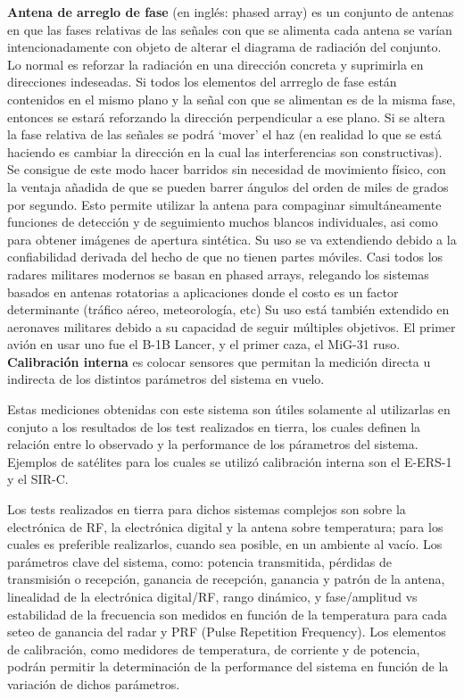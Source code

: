 \documentclass[a4paper,10pt]{article}
\begin{document}
{\textbf{Antena de arreglo de fase}} (en inglés: phased array) es un conjunto de
antenas en que las fases relativas de las señales con que se alimenta cada 
antena se varían intencionadamente con objeto de alterar el diagrama de 
radiación del conjunto. Lo normal es reforzar la radiación en una dirección 
concreta y suprimirla en direcciones indeseadas. Si todos los elementos del 
arrreglo de fase están contenidos en el mismo plano y la señal con que se 
alimentan es de la misma fase, entonces se estará reforzando la dirección 
perpendicular a ese plano. Si se altera la fase relativa de las señales se podrá
 \enquote*{mover} el haz (en realidad lo que se está haciendo es cambiar la 
dirección en la cual las interferencias son constructivas). Se consigue de este
modo hacer barridos sin necesidad de movimiento físico, con la ventaja añadida
de que se pueden barrer ángulos del orden de miles de grados por segundo. Esto
permite utilizar la antena para compaginar simultáneamente funciones de 
detección y de seguimiento muchos blancos individuales, asi como para obtener 
imágenes de apertura sintética. Su uso se va extendiendo debido a la 
confiabilidad derivada del hecho de que no tienen partes móviles. Casi todos los
radares militares modernos se basan en phased arrays, relegando los sistemas 
basados en antenas rotatorias a aplicaciones donde el costo es un factor 
determinante (tráfico aéreo, meteorología, etc) Su uso está también extendido en
aeronaves militares debido a su capacidad de seguir múltiples objetivos. El 
primer avión en usar uno fue el B-1B Lancer, y el primer caza, el MiG-31 ruso.\\

{\textbf{Calibración interna}} es colocar sensores que permitan la medición 
directa u indirecta de los distintos parámetros del sistema en vuelo. 

Estas mediciones obtenidas con este sistema son útiles solamente al utilizarlas
en conjuto a los resultados de los test realizados en tierra, los cuales definen
la relación entre lo observado y la performance de los párametros del sistema. 
Ejemplos de satélites para los cuales se utilizó calibración interna son el 
E-ERS-1 y el SIR-C.
    
Los tests realizados en tierra para dichos sistemas complejos son sobre la
electrónica de RF, la electrónica digital y la antena sobre temperatura; para 
los cuales es preferible realizarlos, cuando sea posible, en un ambiente al 
vacío. Los parámetros clave del sistema, como: potencia transmitida, pérdidas de
transmisión o recepción, ganancia de recepción, ganancia y patrón de la antena, 
linealidad de la electrónica digital/RF, rango dinámico, y fase/amplitud vs 
estabilidad de la frecuencia son medidos en función de la temperatura para cada 
seteo de ganancia del radar y PRF (Pulse Repetition Frequency). Los elementos de
calibración, como medidores de temperatura, de corriente y de potencia, podrán 
permitir la determinación de la performance del sistema en función de la 
variación de dichos parámetros.
    
\end{document}
